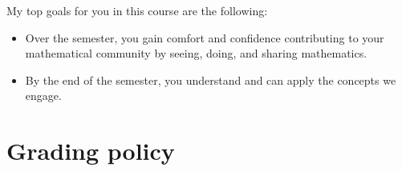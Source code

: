 My top goals for you in this course are the following:
\begin{itemize}
    \item Over the semester, you gain comfort and confidence contributing to your mathematical community by seeing, doing, and sharing mathematics.
    \item By the end of the semester, you understand and can apply the concepts we engage.
\end{itemize}





%
%
%
%

\section{Grading policy}

